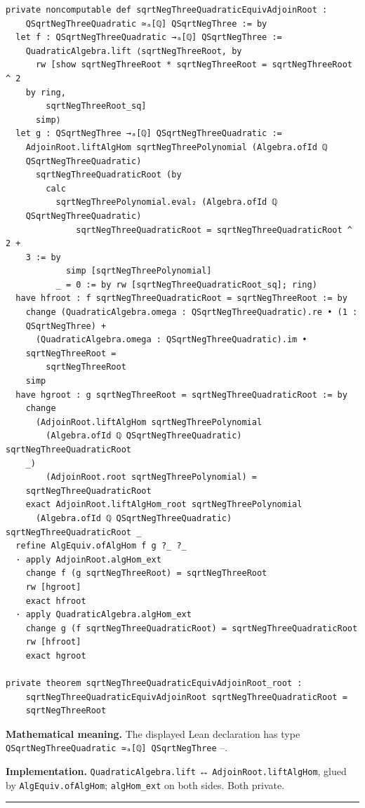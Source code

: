 \documentclass[UTF8,a4paper,11pt,fontset=fandol]{ctexart}
\theoremstyle{definition}
\newcommand{\statementsep}{\par\medskip\hrule\medskip}
\begin{document}
\begin{verbatim}
private noncomputable def sqrtNegThreeQuadraticEquivAdjoinRoot :
    QSqrtNegThreeQuadratic ≃ₐ[ℚ] QSqrtNegThree := by
  let f : QSqrtNegThreeQuadratic →ₐ[ℚ] QSqrtNegThree :=
    QuadraticAlgebra.lift ⟨sqrtNegThreeRoot, by
      rw [show sqrtNegThreeRoot * sqrtNegThreeRoot = sqrtNegThreeRoot ^ 2
    by ring,
        sqrtNegThreeRoot_sq]
      simp⟩
  let g : QSqrtNegThree →ₐ[ℚ] QSqrtNegThreeQuadratic :=
    AdjoinRoot.liftAlgHom sqrtNegThreePolynomial (Algebra.ofId ℚ
    QSqrtNegThreeQuadratic)
      sqrtNegThreeQuadraticRoot (by
        calc
          sqrtNegThreePolynomial.eval₂ (Algebra.ofId ℚ
    QSqrtNegThreeQuadratic)
              sqrtNegThreeQuadraticRoot = sqrtNegThreeQuadraticRoot ^ 2 +
    3 := by
            simp [sqrtNegThreePolynomial]
          _ = 0 := by rw [sqrtNegThreeQuadraticRoot_sq]; ring)
  have hfroot : f sqrtNegThreeQuadraticRoot = sqrtNegThreeRoot := by
    change (QuadraticAlgebra.omega : QSqrtNegThreeQuadratic).re • (1 :
    QSqrtNegThree) +
      (QuadraticAlgebra.omega : QSqrtNegThreeQuadratic).im •
    sqrtNegThreeRoot =
        sqrtNegThreeRoot
    simp
  have hgroot : g sqrtNegThreeRoot = sqrtNegThreeQuadraticRoot := by
    change
      (AdjoinRoot.liftAlgHom sqrtNegThreePolynomial
        (Algebra.ofId ℚ QSqrtNegThreeQuadratic) sqrtNegThreeQuadraticRoot
    _)
        (AdjoinRoot.root sqrtNegThreePolynomial) =
    sqrtNegThreeQuadraticRoot
    exact AdjoinRoot.liftAlgHom_root sqrtNegThreePolynomial
      (Algebra.ofId ℚ QSqrtNegThreeQuadratic) sqrtNegThreeQuadraticRoot _
  refine AlgEquiv.ofAlgHom f g ?_ ?_
  · apply AdjoinRoot.algHom_ext
    change f (g sqrtNegThreeRoot) = sqrtNegThreeRoot
    rw [hgroot]
    exact hfroot
  · apply QuadraticAlgebra.algHom_ext
    change g (f sqrtNegThreeQuadraticRoot) = sqrtNegThreeQuadraticRoot
    rw [hfroot]
    exact hgroot

private theorem sqrtNegThreeQuadraticEquivAdjoinRoot_root :
    sqrtNegThreeQuadraticEquivAdjoinRoot sqrtNegThreeQuadraticRoot =
    sqrtNegThreeRoot
\end{verbatim}
\noindent\textbf{Mathematical meaning.} The displayed Lean declaration has type \texttt{QSqrtNegThreeQuadratic ≃ₐ[ℚ] QSqrtNegThree} --.\par
\noindent\textbf{Implementation.} \texttt{QuadraticAlgebra.\allowbreak{}lift} ↔ \texttt{AdjoinRoot.\allowbreak{}liftAlgHom}, glued by \texttt{AlgEquiv.\allowbreak{}ofAlgHom}; \texttt{algHom\_\allowbreak{}ext} on both sides. Both private.\par
\statementsep
\end{document}
